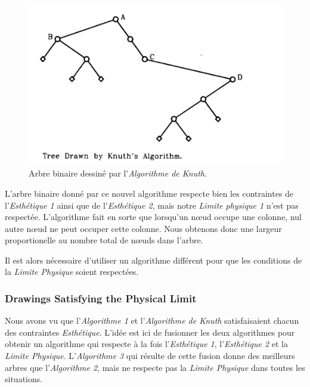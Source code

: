 \documentclass{article}
\begin{document}
    \vfill
    \begin{figure}[h]
    		\begin{center}
    			\includegraphics[scale=0.5]{arbreBinaire.png}
    		\end{center}
    	\caption{Arbre binaire dessiné par l'\emph{Algorithme de Knuth}. \cite{article79}}
      \label{fig:arbreBinaire}
    \end{figure}
    \vfill

    L'arbre binaire donné par ce nouvel algorithme respecte bien les contraintes de l'\emph{Esthétique 1} ainsi que de l'\emph{Esthétique 2}, mais notre \emph{Limite physique 1} n'est pas respectée. L'algorithme fait en sorte que lorsqu’un n\oe{}ud occupe une colonne, nul autre n\oe{}ud ne peut occuper cette colonne. Nous obtenons donc une largeur proportionelle au nombre total de n\oe{}uds dans l'arbre.

    Il est alors nécessaire d'utiliser un algorithme différent pour que les conditions de la \emph{Limite Physique} soient respectées.

\newpage
    \subsubsection{Drawings Satisfying the Physical Limit}

    Nous avons vu que l'\emph{Algorithme 1} et l'\emph{Algorithme de Knuth} satisfaisaient chacun des contraintes \emph{Esthétique}. L'idée est ici de fusionner les deux algorithmes pour obtenir un algorithme qui respecte à la fois l'\emph{Esthétique 1}, l'\emph{Esthétique 2} et la \emph{Limite Physique}. L'\emph{Algorithme 3} qui résulte de cette fusion donne des meilleurs arbres que l'\emph{Algorithme 2}, mais ne respecte pas la \emph{Limite Physique} dans toutes les situations.
\end{document}
